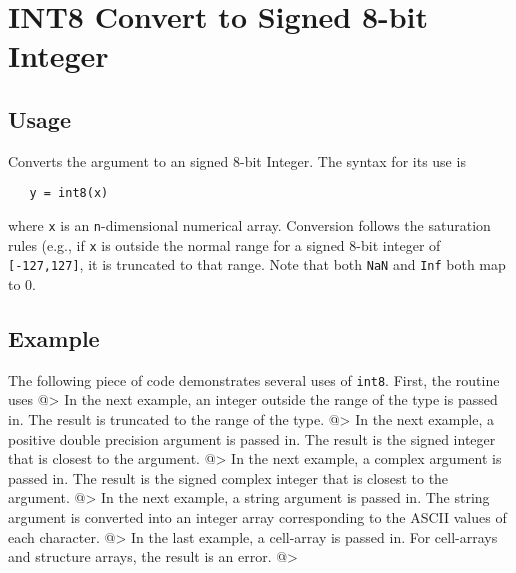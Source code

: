 \section{INT8 Convert to Signed 8-bit Integer}

\subsection{Usage}

Converts the argument to an signed 8-bit Integer.  The syntax
for its use is
\begin{verbatim}
   y = int8(x)
\end{verbatim}
where \verb|x| is an \verb|n|-dimensional numerical array.  Conversion
follows the saturation rules (e.g., if \verb|x| is outside the normal
range for a signed 8-bit integer of \verb|[-127,127]|, it is truncated to that
range.  Note that
both \verb|NaN| and \verb|Inf| both map to 0.
\subsection{Example}

The following piece of code demonstrates several uses of \verb|int8|.  First, the routine uses
@>
In the next example, an integer outside the range  of the type is passed in.  
The result is truncated to the range of the type.
@>
In the next example, a positive double precision argument is passed in.  
The result is the signed integer that is closest to the argument.
@>
In the next example, a complex argument is passed in.  The result is the 
signed complex integer that is closest to the argument.
@>
In the next example, a string argument is passed in.  The string argument 
is converted into an integer array corresponding to the ASCII values of each character.
@>
In the last example, a cell-array is passed in.  For cell-arrays and 
structure arrays, the result is an error.
@>
